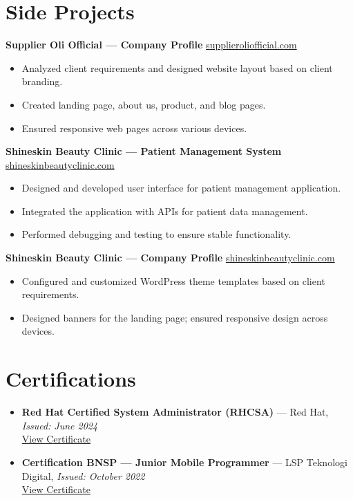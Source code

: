 \documentclass[a4paper,11pt]{article}
\begin{document}
\section{Side Projects}

\textbf{Supplier Oli Official --- Company Profile} \hfill
\href{https://supplieroliofficial.com}{supplieroliofficial.com}
\begin{itemize}[leftmargin=*, nosep, topsep=2pt]
  \item Analyzed client requirements and designed website layout based on client branding.
  \item Created landing page, about us, product, and blog pages.
  \item Ensured responsive web pages across various devices.
\end{itemize}

\vspace{4pt}

\textbf{Shineskin Beauty Clinic --- Patient Management System} \hfill
\href{https://ariikurniawan-dev.ai.id?project=ShineSkin_Beauty_Clinic_Patient_Management_System}{shineskinbeautyclinic.com}
\begin{itemize}[leftmargin=*, nosep, topsep=2pt]
  \item Designed and developed user interface for patient management application.
  \item Integrated the application with APIs for patient data management.
  \item Performed debugging and testing to ensure stable functionality.
\end{itemize}

\vspace{4pt}

\textbf{Shineskin Beauty Clinic --- Company Profile} \hfill
\href{https://shineskinbeautyclinic.com}{shineskinbeautyclinic.com}
\begin{itemize}[leftmargin=*, nosep, topsep=2pt]
  \item Configured and customized WordPress theme templates based on client requirements.
  \item Designed banners for the landing page; ensured responsive design across devices.
\end{itemize}

\section{Certifications}

\begin{itemize}[leftmargin=*, nosep]
  \item \textbf{Red Hat Certified System Administrator (RHCSA)} --- Red Hat, \textit{Issued: June 2024} \\
  \href{https://rhtapps.redhat.com/verify?certId=240-096-156}{View Certificate}
  
  \item \textbf{Certification BNSP --- Junior Mobile Programmer} --- LSP Teknologi Digital, \textit{Issued: October 2022} \\
  \href{https://riikurniawan.github.io?cert=Junior_Mobile_Programmer}{View Certificate}
\end{itemize}
\end{document}
